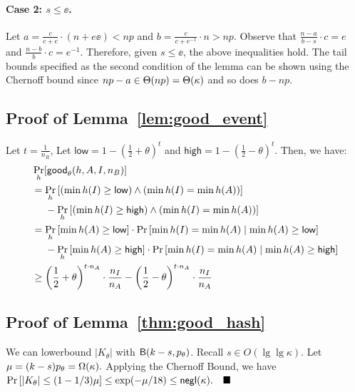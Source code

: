\paragraph{Case 2: $s \le \ee$.} 
Let $a = \frac{c}{c+e} \cdot (n+e\ee) < np$ and $b = \frac{c}{c+e^{-1}}
\cdot n > np$. Observe that $\frac{n-a} {b-s} \cdot c = e$ and
$\frac{n-b}{b} \cdot c = e^{-1}$. Therefore, given $s \le \ee$, the above inequalities hold. The
tail bounds specified as the second condition of the lemma can be shown using
the Chernoff bound since $np-a \in \Theta(np) = \Theta(\kappa)$ and so does $b-np$.

\subsection{Proof of Lemma~\ref{lem:good_event}} \label{apx:proof:good_event}
Let $t = \frac{1}{n_R}$,  Let $\mathsf{low} =
1-\left(\frac{1}{2}+\theta\right)^t$ and $\mathsf{high}
= 1-\left(\frac{1}{2}-\theta\right)^t$. 
Then, we have:
\begin{align*}
    &\Pr_{h}[\mathsf{good}_\theta(h, A, I, n_B)]  \\
    & = \Pr_{h} \left[\left(\min h(I) \geq\mathsf{low}\right) \land \left(\min h(I) = \min h(A)\right)\right] \\
    & ~~~~ - \Pr_{h} \left[\left(\min h(I) \geq \mathsf{high}\right) \land \left(\min h(I) = \min h(A)\right)\right]\\
    & = \Pr_{h} \left[\min h(A) \geq\mathsf{low}\right] \cdot \Pr\left[ \min h(I) = \min h(A) \mid \min h(A) \geq\mathsf{low}\right] \\
    & ~~~~ - \Pr_{h} \left[\min h(A) \geq \mathsf{high}\right] \cdot \Pr\left[ \min h(I) = \min h(A) \mid \min h(A) \geq \mathsf{high}\right] \\
    & \ge \left(\frac{1}{2}+\theta\right)^{t \cdot n_A} \cdot
    \frac{n_I}{n_A} - \left(\frac{1}{2}-\theta\right)^{t \cdot n_A}
    \cdot \frac{n_I}{n_A}
\end{align*}

\subsection{Proof of Lemma~\ref{thm:good_hash}} \label{apx:proof:good_hash} 
We can lowerbound $|K_\theta|$ with $\mathsf{B}(k-s, p_\theta)$. Recall $s \in O(\lg\lg\kappa)$. 
Let $\mu = (k-s) p_\theta = \Omega(\kappa).$ Applying the Chernoff
Bound, we have 
%
$\Pr\left[ |K_\theta| \le (1 - 1/3) \mu \right] \le \exp(-\mu/18) \le \mathsf{negl}(\kappa). \quad\blacksquare$






